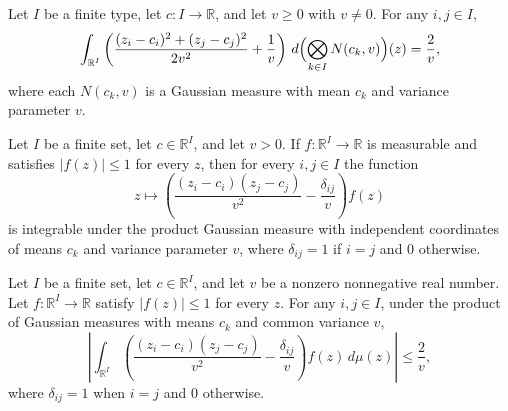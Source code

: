 \begin{lemma}
\leanok
{}
Let $I$ be a finite type, let $c:I\to\mathbb R$, and let $v\ge0$ with $v\ne0$. For any
$i,j\in I$,
\[
\int_{\mathbb
R^I}\left(\frac{(z_i-c_i)^2+(z_j-c_j)^2}{2v^2}+\frac1v\right)\,d\Bigl(\bigotimes_{k\in
I}N(c_k,v)\Bigr)(z)=\frac2v,
\]
where each $N(c_k,v)$ is a Gaussian measure with mean $c_k$ and variance parameter $v$.
\end{lemma}

\begin{lemma}
\leanok
{}
Let $I$ be a finite set, let $c\in\mathbb R^I$, and let $v>0$. If $f:\mathbb
R^I\to\mathbb R$ is measurable and satisfies $|f(z)|\le 1$ for every $z$, then for every
$i,j\in I$ the function
\[z\longmapsto \left(\frac{(z_i-c_i)(z_j-c_j)}{v^2}-\frac{\delta_{ij}}{v}\right)f(z)
\]
is integrable under the product Gaussian measure with independent coordinates of means
$c_k$ and variance parameter $v$, where $\delta_{ij}=1$ if $i=j$ and $0$ otherwise.
\end{lemma}

\begin{lemma}
\leanok
{}
Let $I$ be a finite set, let $c\in\mathbb R^I$, and let $v$ be a nonzero nonnegative
real number. Let $f:\mathbb R^I\to\mathbb R$ satisfy $|f(z)|\le1$ for every $z$. For any
$i,j\in I$, under the product of Gaussian measures with means $c_k$ and common variance
$v$, \[\left|\int_{\mathbb
R^I}\left(\frac{(z_i-c_i)(z_j-c_j)}{v^2}-\frac{\delta_{ij}}{v}\right)f(z)\,d\mu(z)\right|\le\frac2v,\]
where $\delta_{ij}=1$ when $i=j$ and $0$ otherwise.
\end{lemma}
